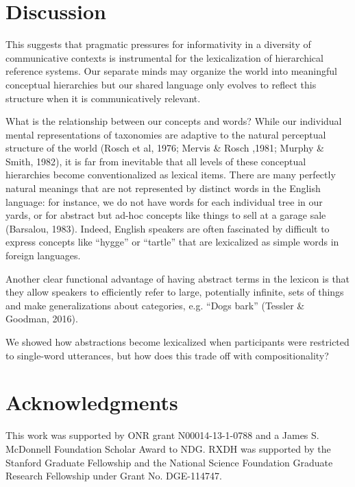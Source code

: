 \documentclass[10pt,letterpaper]{article}
\begin{document}
\section{Discussion}

This suggests that pragmatic pressures for informativity in a diversity of communicative contexts is instrumental for the lexicalization of hierarchical reference systems. Our separate minds may organize the world into meaningful conceptual hierarchies but our shared language only evolves to reflect this structure when it is communicatively relevant. 

What is the relationship between our concepts and words? While our individual mental representations of taxonomies are adaptive to the natural perceptual structure of the world (Rosch et al, 1976; Mervis \& Rosch ,1981; Murphy \& Smith, 1982), it is far from inevitable that all levels of these conceptual hierarchies become conventionalized as lexical items. There are many perfectly natural meanings that are not represented by distinct words in the English language: for instance, we do not have words for each individual tree in our yards, or for abstract but ad-hoc concepts like things to sell at a garage sale (Barsalou, 1983). Indeed, English speakers are often fascinated by difficult to express concepts like ``hygge'' or ``tartle'' that are lexicalized as simple words in foreign languages.

Another clear functional advantage of having abstract terms in the lexicon is that they allow speakers to efficiently refer to large, potentially infinite, sets of things and make generalizations about categories, e.g. ``Dogs bark'' (Tessler \& Goodman, 2016). 


We showed how abstractions become lexicalized when participants were restricted to single-word utterances, but how does this trade off with compositionality?



\section{\bf Acknowledgments}
\small
This work was supported by ONR grant N00014-13-1-0788 and a James S. McDonnell Foundation Scholar Award to NDG. RXDH was supported by the Stanford Graduate Fellowship and the National Science Foundation Graduate Research Fellowship under Grant No. DGE-114747.



\setlength{\bibleftmargin}{.125in}
\setlength{\bibindent}{-\bibleftmargin}


\end{document}

